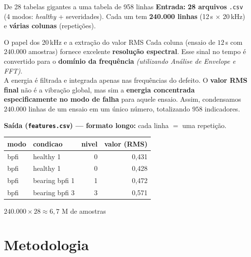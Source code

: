 \documentclass{beamer}
\begin{document}
\begin{frame}{De 28 tabelas gigantes a uma tabela de 958 linhas}
    \footnotesize
    \textbf{Entrada:} \textbf{28 arquivos} \texttt{.csv} (4 modos: \textit{healthy} + severidades). Cada um tem \textbf{240.000 linhas} (12\,s $\times$ 20\,kHz) e \textbf{várias colunas} (repetições).
    \vspace{0.1cm}

    \begin{block}{O papel dos 20\,kHz e a extração do valor RMS}
        Cada coluna (ensaio de $12$\,s com $240.000$ amostras) fornece excelente \textbf{resolução espectral}. Esse sinal no tempo é convertido para o \textbf{domínio da frequência} \textit{(utilizando Análise de Envelope e FFT)}.\\[3pt]
        A energia é filtrada e integrada apenas nas frequências do defeito. O \textbf{valor RMS final} não é a vibração global, mas sim a \textbf{energia concentrada especificamente no modo de falha} para aquele ensaio. Assim, condensamos $240.000$ linhas de um ensaio em um único número, totalizando $958$ indicadores.
    \end{block}
    \vspace{0.1cm}
    \textbf{Saída (\texttt{features.csv}) --- formato longo:} cada linha $=$ uma repetição.
    \vspace{0.05cm}

    \begin{tabular}{llrr}
        \toprule
        \textbf{modo} & \textbf{condicao} & \textbf{nivel} & \textbf{valor (RMS)} \\
        \midrule
        bpfi & healthy 1      & 0 & 0,431 \\
        bpfi & healthy 1      & 0 & 0,428 \\
        bpfi & bearing bpfi 1 & 1 & 0,472 \\
        bpfi & bearing bpfi 3 & 3 & 0,571 \\
        \bottomrule
    \end{tabular}
    \hfill {\scriptsize $240.000 \times 28 \approx 6{,}7$ M de amostras}
    \normalsize
\end{frame}

\section{Metodologia}
\end{document}
